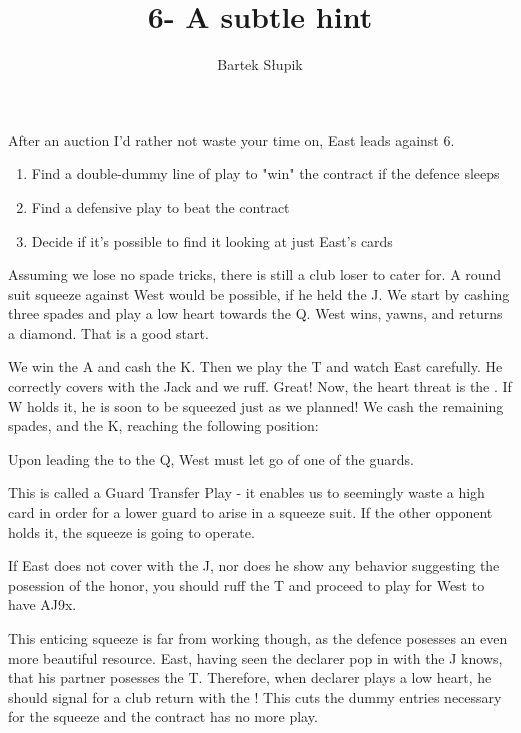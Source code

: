 \documentclass[12pt, a4paper]{article}
\title{\vspace*{-3.0cm}6\spades - A subtle hint}
\author{Bartek Słupik}
\begin{document}
\maketitle

After an auction I'd rather not waste your time on, East leads  against 6\spades.
\begin{enumerate}
    \item Find a double-dummy line of play to "win" the contract if the defence sleeps
    \item Find a defensive play to beat the contract
    \item Decide if it's possible to find it looking at just East's cards
\end{enumerate}

\handdiagramv
        {}
        {}
        {}
        {}
        {}

\pagebreak

Assuming we lose no spade tricks, there is still a club loser to cater for. A round suit squeeze
against West would be possible, if he held the \xhearts J. We start by cashing three spades
and play a low heart towards the \xhearts Q. West wins, yawns, and returns a diamond.
That is a good start. 

We win the \xdiams A and cash the \xhearts K. Then we play the \xhearts T and watch East carefully.
He correctly covers with the Jack and we ruff. Great! Now, the heart threat is the . If W holds it, 
he is soon to be squeezed just as we planned! We cash the remaining spades, and the \xdiams K, reaching the following position: 

\handdiagramv
        {}
        {}
        {}
        {}
        {}

Upon leading the  to the \xdiams Q, West must let go of one of the guards.

This is called a Guard Transfer Play - it enables us to seemingly waste a high card in order
for a lower guard to arise in a squeeze suit. If the other opponent holds it, the squeeze is going to operate.

If East does not cover with the \xhearts J, nor does he show any behavior suggesting the posession of the honor,
you should ruff the \xhearts T and proceed to play for West to have \xhearts AJ9x.

This enticing squeeze is far from working though, as the defence posesses an even more beautiful resource.
East, having seen the declarer pop in with the \xclubs J knows, that his partner posesses the \xclubs T.
Therefore, when declarer plays a low heart, he should signal for a club return with the !
This cuts the dummy entries necessary for the squeeze and the contract has no more play.
\end{document}
